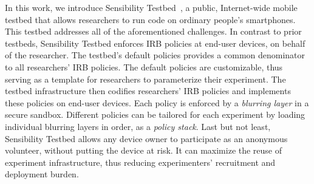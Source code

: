 In this work, we introduce 
Sensibility Testbed~\cite{sensibility, zhuang2015privacy}, a public, 
Internet-wide mobile testbed that allows researchers to run code on ordinary
people's smartphones. This testbed addresses all of the 
aforementioned challenges.
%   
In contrast to prior testbeds, Sensibility Testbed enforces IRB policies
at end-user devices, on behalf of the researcher. The testbed's 
default policies provides a common denominator to all researchers' 
IRB policies. %
The default policies are customizable, thus serving as a template 
for researchers to parameterize their experiment. The testbed 
infrastructure then codifies researchers' IRB policies and 
implements these policies on end-user devices. Each 
policy is enforced by a \textit{blurring layer} in a secure 
sandbox. Different policies can be tailored for each experiment by loading
individual blurring layers in order, as a \textit{policy stack}. 
Last but not least, Sensibility Testbed allows
any device owner to participate as an anonymous volunteer,
without putting the device at risk. It can  
maximize the reuse of experiment infrastructure, thus reducing 
experimenters' recruitment and deployment burden. 
%
%
%
%
			
